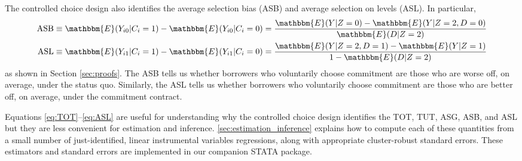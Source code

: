 \documentclass[12pt, a4paper]{article}
\begin{document}
The controlled choice design also identifies the average selection bias (ASB) and average selection on levels (ASL). In particular,
\begin{align}
\label{eq:ASB}
    \text{ASB} &\equiv \mathbbm{E}(Y_{i0}|C_i=1) - \mathbbm{E}(Y_{i0}|C_i = 0) = \frac{\mathbbm{E}(Y|Z=0) - \mathbbm{E}(Y|Z=2,D=0)}{\mathbbm{E}(D|Z=2)}\\
    \label{eq:ASL}
    \text{ASL} &\equiv \mathbbm{E}(Y_{i1}|C_i = 1) - \mathbbm{E}(Y_{i1}|C_i=0) = \frac{\mathbbm{E}(Y|Z=2,D=1) - \mathbbm{E}(Y|Z=1)}{1 - \mathbbm{E}(D|Z=2)}
\end{align}
as shown in Section \ref{sec:proofs}.
The ASB tells us whether borrowers who voluntarily choose commitment are those who are worse off, on average, under the status quo.
Similarly, the ASL tells us whether borrowers who voluntarily choose commitment are those who are better off, on average, under the commitment contract.

Equations \eqref{eq:TOT}--\eqref{eq:ASL} are useful for understanding why the controlled choice design identifies the TOT, TUT, ASG, ASB, and ASL but they are less convenient for estimation and inference. 
\autoref{sec:estimation_inference} explains how to compute each of these quantities from a small  number of just-identified, linear instrumental variables regressions, along with appropriate cluster-robust standard errors.
These estimators and standard errors are implemented in our companion STATA package. %





\end{document}
